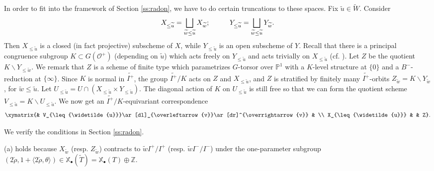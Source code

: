 \documentclass{amsart}
\theoremstyle{plain}
\theoremstyle{definition}
\theoremstyle{remark}
\numberwithin{equation}{subsection}
\begin{document}
In order to fit into the framework of Section \ref{ss:radon}, we have to do certain truncations to these spaces. Fix ${\widetilde{u}}\in {\widetilde{W}}$. Consider
\begin{equation*}
X_{\leq{\widetilde{u}}}=\bigsqcup_{{\widetilde{w}}\leq{\widetilde{u}}}X_{\widetilde{w}};\hspace{1 cm} Y_{\leq{\widetilde{u}}}=\bigsqcup_{{\widetilde{w}}\leq{\widetilde{u}}}Y_{\widetilde{w}}.
\end{equation*}
Then $X_{\leq{\widetilde{u}}}$ is a closed (in fact projective) subscheme of $X$, while $Y_{\leq{\widetilde{u}}}$ is an open subscheme of $Y$. Recall that there is a principal congruence subgroup $K\subset G({\mathcal{O}}^+)$ (depending on ${\widetilde{u}}$) which acts freely on $Y_{\leq{\widetilde{u}}}$ and acts trivially on $X_{\leq{\widetilde{u}}}$ (cf. \cite{Ka}). Let $Z$ be the quotient $K\backslash Y_{\leq{\widetilde{w}}}$. We remark that $Z$ is a scheme of finite type which parametrizes $G$-torsor over ${\mathbb{P}}^1$ with a $K$-level structure at $\{0\}$ and a $B^-$-reduction at $\{\infty\}$. Since $K$ is normal in ${\widetilde{I^+}}$, the group ${\widetilde{I^+}}/K$ acts on $Z$ and $X_{\leq{\widetilde{u}}}$, and $Z$ is stratified by finitely many ${\widetilde{I^+}}$-orbits $Z_{\widetilde{w}}=K\backslash Y_{\widetilde{w}}$, for ${\widetilde{w}}\leq{\widetilde{u}}$. Let $U_{\leq{\widetilde{u}}}=U\cap(X_{\leq{\widetilde{u}}}\times Y_{\leq{\widetilde{u}}})$. The diagonal action of $K$ on $U_{\leq{\widetilde{u}}}$ is still free so that we can form the quotient scheme $V_{\leq{\widetilde{u}}}=K\backslash U_{\leq{\widetilde{u}}}$. We now get an ${\widetilde{I^+}}/K$-equivariant correspondence
\begin{equation*}
\xymatrix{& V_{\leq{\widetilde{u}}}\ar[dl]_{\overleftarrow{v}}\ar[dr]^{\overrightarrow{v}} & \\ X_{\leq{\widetilde{u}}} & & Z}.
\end{equation*}

We verify the conditions in Section \ref{ss:radon}. 

(a) holds because $X_{\widetilde{w}}$ (resp. $Z_{\widetilde{w}}$) contracts to ${\widetilde{w}} I^+/I^+$ (resp. ${\widetilde{w}} I^-/I^-$) under the one-parameter subgroup $(2\check{\rho},1+\langle2\check{\rho},\theta\rangle)\in{\mathbb{X}_\bullet}({\widetilde{T}})={\mathbb{X}_\bullet}(T)\oplus{\mathbb{Z}}$.
\end{document}
